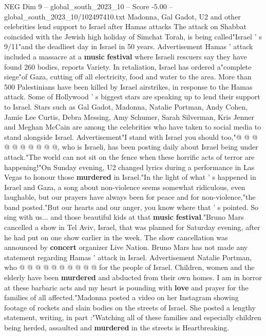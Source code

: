 \begin{textsample}{NEG Dim 9 – global\_south\_2023\_10 – Score -5.00 – global\_south\_2023\_10/102497410.txt}  \label{ex:f9_neg_369}
Madonna, Gal Gadot, U2 and other celebrities lend support to Israel after Hamas attacks The attack on Shabbat coincided with the Jewish high holiday of Simchat Torah, is being called"Israel ' s 9/11"and the deadliest day in Israel in 50 years.
Advertisement Hamas ' attack included a massacre at a \textbf{music} \textbf{festival} where Israeli rescuers say they have found 260 bodies, reports Variety.
In retaliation, Israel has ordered a"complete siege"of Gaza, cutting off all electricity, food and water to the area.
More than 500 Palestinians have been killed by Israel airstrikes, in response to the Hamas attack.
Some of Hollywood ' s biggest stars are speaking up to lend their support to Israel.
Stars such as Gal Gadot, Madonna, Natalie Portman, Andy Cohen, Jamie Lee Curtis, Debra Messing, Amy Schumer, Sarah Silverman, Kris Jenner and Meghan McCain are among the celebrities who have taken to social media to stand alongside Israel.
Advertisement"I stand with Israel you should too,"@ @ @ @ @ @ @ @ @ @, who is Israeli, has been posting daily about Israel being under attack."The world can not sit on the fence when these horrific acts of terror are happening!"On Sunday evening, U2 changed lyrics during a performance in Las Vegas to honour those \textbf{murdered} in Israel."In the light of what ' s happened in Israel and Gaza, a song about non-violence seems somewhat ridiculous, even laughable, but our prayers have always been for peace and for non-violence,"the band posted."But our hearts and our anger, you know where that ' s pointed.
So sing with us... and those beautiful kids at that \textbf{music} \textbf{festival}."Bruno Mars cancelled a show in Tel Aviv, Israel, that was planned for Saturday evening, after he had put on one show earlier in the week.
The show cancellation was announced by \textbf{concert} organizer Live Nation.
Bruno Mars has not made any statement regarding Hamas ' attack in Israel.
Advertisement Natalie Portman, who @ @ @ @ @ @ @ @ @ @ for the people of Israel.
Children, women and the elderly have been \textbf{murdered} and abducted from their own homes.
I am in horror at these barbaric acts and my heart is pounding with \textbf{love} and prayer for the families of all affected."Madonna posted a video on her Instagram showing footage of rockets and slain bodies on the streets of Israel.
She posted a lengthy statement, writing, in part :"Watching all of these families and especially children being herded, assaulted and \textbf{murdered} in the streets is Heartbreaking.

\end{textsample}
